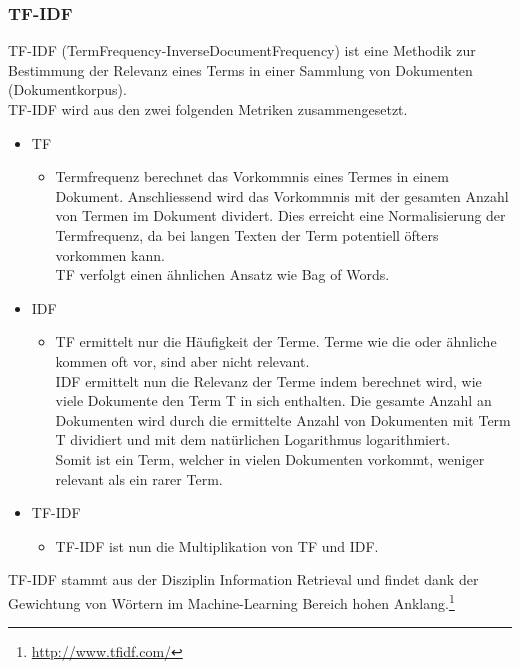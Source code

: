 \subsubsection{TF-IDF}
TF-IDF (TermFrequency-InverseDocumentFrequency) ist eine Methodik zur Bestimmung der Relevanz eines Terms in einer Sammlung von Dokumenten (Dokumentkorpus).\\
TF-IDF wird aus den zwei folgenden Metriken zusammengesetzt.
\begin{itemize}
	\item TF
	\begin{itemize}
		\item Termfrequenz berechnet das Vorkommnis eines Termes in einem Dokument. Anschliessend wird das Vorkommnis mit der gesamten Anzahl von Termen im Dokument dividert. Dies erreicht eine Normalisierung der Termfrequenz, da bei langen Texten der Term potentiell öfters vorkommen kann.\\
		TF verfolgt einen ähnlichen Ansatz wie Bag of Words.
	\end{itemize}
	\item IDF
	\begin{itemize}
		\item TF ermittelt nur die Häufigkeit der Terme. Terme wie \glqq die\grqq{} oder ähnliche kommen oft vor, sind aber nicht relevant.\\
		IDF ermittelt nun die Relevanz der Terme indem berechnet wird, wie viele Dokumente den Term T in sich enthalten. Die gesamte Anzahl an Dokumenten wird durch die ermittelte Anzahl von Dokumenten mit Term T dividiert und mit dem natürlichen Logarithmus logarithmiert.\\
		Somit ist ein Term, welcher in vielen Dokumenten vorkommt, weniger relevant als ein rarer Term.
	\end{itemize}
	\item TF-IDF
	\begin{itemize}
		\item TF-IDF ist nun die Multiplikation von TF und IDF.
	\end{itemize}
\end{itemize}
TF-IDF stammt aus der Disziplin \glqq Information Retrieval\grqq{} und findet dank der Gewichtung von Wörtern im Machine-Learning Bereich hohen Anklang.\footnote{\url{http://www.tfidf.com/}}

